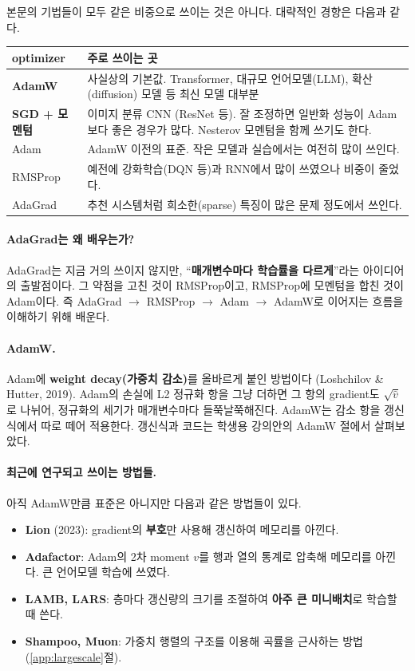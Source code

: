 \documentclass[11pt,a4paper]{article}
\begin{document}
본문의 기법들이 모두 같은 비중으로 쓰이는 것은 아니다.
대략적인 경향은 다음과 같다.

\begin{center}
\begin{tabular}{@{}lp{}@{}}
\toprule
optimizer & 주로 쓰이는 곳 \\
\midrule
\textbf{AdamW} & 사실상의 기본값. Transformer, 대규모 언어모델(LLM), 확산(diffusion) 모델 등 최신 모델 대부분 \\[3pt]
\textbf{SGD + 모멘텀} & 이미지 분류 CNN (ResNet 등). 잘 조정하면 일반화 성능이 Adam보다 좋은 경우가 많다.
Nesterov 모멘텀을 함께 쓰기도 한다. \\[3pt]
Adam & AdamW 이전의 표준. 작은 모델과 실습에서는 여전히 많이 쓰인다. \\[3pt]
RMSProp & 예전에 강화학습(DQN 등)과 RNN에서 많이 쓰였으나 비중이 줄었다. \\[3pt]
AdaGrad & 추천 시스템처럼 희소한(sparse) 특징이 많은 문제 정도에서 쓰인다. \\
\bottomrule
\end{tabular}
\end{center}

\paragraph{AdaGrad는 왜 배우는가?}
AdaGrad는 지금 거의 쓰이지 않지만, ``\textbf{매개변수마다 학습률을 다르게}''라는 아이디어의 출발점이다.
그 약점을 고친 것이 RMSProp이고, RMSProp에 모멘텀을 합친 것이 Adam이다.
즉 AdaGrad $\rightarrow$ RMSProp $\rightarrow$ Adam $\rightarrow$ AdamW로 이어지는 흐름을 이해하기 위해 배운다.

\paragraph{AdamW.}
Adam에 \textbf{weight decay(가중치 감소)}를 올바르게 붙인 방법이다 (Loshchilov \& Hutter, 2019).
Adam의 손실에 L2 정규화 항을 그냥 더하면 그 항의 gradient도 $\sqrt{\hat v}$로 나뉘어,
정규화의 세기가 매개변수마다 들쭉날쭉해진다.
AdamW는 감소 항을 갱신식에서 따로 떼어 적용한다.
갱신식과 코드는 학생용 강의안의 AdamW 절에서 살펴보았다.

\paragraph{최근에 연구되고 쓰이는 방법들.}
아직 AdamW만큼 표준은 아니지만 다음과 같은 방법들이 있다.
\begin{itemize}[leftmargin=1.8em]
\item \textbf{Lion} (2023): gradient의 \textbf{부호}만 사용해 갱신하여 메모리를 아낀다.
\item \textbf{Adafactor}: Adam의 2차 moment $v$를 행과 열의 통계로 압축해 메모리를 아낀다. 큰 언어모델 학습에 쓰였다.
\item \textbf{LAMB, LARS}: 층마다 갱신량의 크기를 조절하여 \textbf{아주 큰 미니배치}로 학습할 때 쓴다.
\item \textbf{Shampoo, Muon}: 가중치 행렬의 구조를 이용해 곡률을 근사하는 방법 (\ref{app:largescale}절).
\end{itemize}
\end{document}
